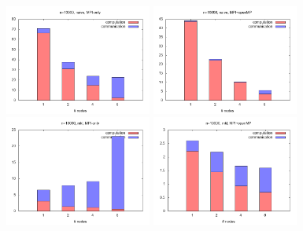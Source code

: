 \documentclass[12pt]{extarticle}
\begin{document}
\begin{figure}[H]
	\centering
	\includegraphics[width=0.43\textwidth]{plot_10000_naive_serial.png} 
	\qquad
	\includegraphics[width=0.43\textwidth]{plot_10000_naive_thread.png} 
	\qquad
	\includegraphics[width=0.43\textwidth]{plot_10000_mkl_serial.png} 
	\qquad
	\includegraphics[width=0.43\textwidth]{plot_10000_mkl_thread.png} 
\end{figure}
\end{document}
